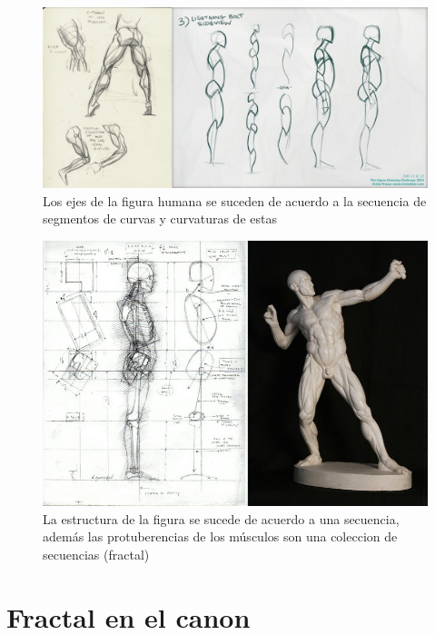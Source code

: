 \documentclass[
  11pt,
]{krantz}
\theoremstyle{definition}
\theoremstyle{definition}
\theoremstyle{definition}
\theoremstyle{definition}
\theoremstyle{remark}
\begin{document}
\begin{figure}[!ht]

{\centering \includegraphics[width=1\linewidth]{body} 

}

\caption{Los ejes de la figura humana se suceden de acuerdo a la secuencia de segmentos de curvas y curvaturas de estas}\label{fig:body}
\end{figure}

\begin{figure}[!ht]

{\centering \includegraphics[width=1\linewidth]{body2} 

}

\caption{La estructura de la figura se sucede de acuerdo a una secuencia, además las protuberencias de los músculos son una coleccion de secuencias (fractal)}\label{fig:body2}
\end{figure}

\hypertarget{fractal-en-el-canon}{%
\section{Fractal en el canon}\label{fractal-en-el-canon}}
\end{document}
